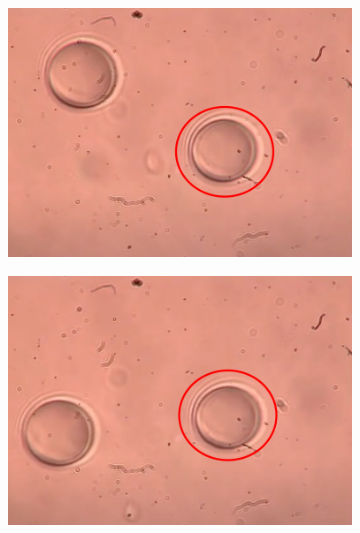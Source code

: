\documentclass[letterpaper,12pt,oneside]{book}
\begin{document}
\begin{figure}[H]
     \centering
     \begin{subfigure}[b]{0.3\textwidth}
         \centering
         \includegraphics[width=\textwidth]{orbitando2.png}
         \caption{}
         \label{fig:y equals x}
     \end{subfigure}
     \hfill
     \begin{subfigure}[b]{0.3\textwidth}
         \centering
         \includegraphics[width=\textwidth]{orbitando3.png}
         \caption{}
         \label{fig:three sin x}
     \end{subfigure}
     \hfill
     \begin{subfigure}[b]{0.3\textwidth}
         \centering

\end{subfigure}
\end{figure}
\end{document}
